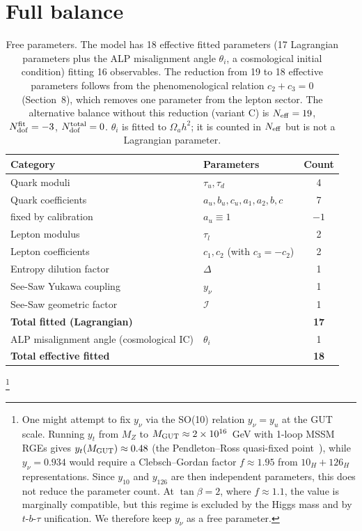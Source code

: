 \documentclass[12pt,a4paper]{article}
\numberwithin{equation}{section}
\begin{document}
\section{Full balance}
\begin{table}[H]
\centering
\caption{Free parameters. The model has 18 effective fitted parameters (17 Lagrangian parameters plus the ALP misalignment angle \(\theta_i\), a cosmological initial condition) fitting 16 observables. The reduction from 19 to 18 effective parameters follows from the phenomenological relation \(c_2 + c_3 = 0\) (Section~8), which removes one parameter from the lepton sector. The alternative balance without this reduction (variant C) is \(N_{\rm eff} = 19\), \(N_{\rm dof}^{\rm fit} = -3\), \(N_{\rm dof}^{\rm total} = 0\). \(\theta_i\) is fitted to \(\Omega_a h^2\); it is counted in \(N_{\rm eff}\) but is not a Lagrangian parameter.}
\begin{tabular}{llc}
\toprule
Category & Parameters & Count \\
\midrule
Quark moduli & \(\tau_u, \tau_d\) & 4 \\
Quark coefficients & \(a_u, b_u, c_u, a_1, a_2, b, c\) & 7 \\
\quad fixed by calibration & \(a_u \equiv 1\) & \(-1\) \\
Lepton modulus & \(\tau_l\) & 2 \\
Lepton coefficients & \(c_1, c_2\) (with \(c_3 = -c_2\)) & 2 \\
Entropy dilution factor & \(\Delta\) & 1 \\
See-Saw Yukawa coupling & \(y_\nu\) & 1 \\
See-Saw geometric factor & \(\mathcal{I}\) & 1 \\
\midrule
\textbf{Total fitted (Lagrangian)} & & \textbf{17} \\
\midrule
ALP misalignment angle (cosmological IC) & \(\theta_i\) & 1 \\
\midrule
\textbf{Total effective fitted} & & \textbf{18} \\
\bottomrule
\end{tabular}
\end{table}

\vspace{0.3cm}
\noindent\footnote{One might attempt to fix \(y_\nu\) via the SO(10) relation \(y_\nu = y_u\) at the GUT scale. Running \(y_t\) from \(M_Z\) to \(M_{\rm GUT} \approx 2\times 10^{16}\)~GeV with 1-loop MSSM RGEs gives \(y_t(M_{\rm GUT}) \approx 0.48\) (the Pendleton--Ross quasi-fixed point~\cite{PendletonRoss1981}), while \(y_\nu = 0.934\) would require a Clebsch--Gordan factor \(f \approx 1.95\) from \(10_H + 126_H\) representations. Since \(y_{10}\) and \(y_{126}\) are then independent parameters, this does not reduce the parameter count. At \(\tan\beta = 2\), where \(f \approx 1.1\), the value is marginally compatible, but this regime is excluded by the Higgs mass and by \(t\)-\(b\)-\(\tau\) unification. We therefore keep \(y_\nu\) as a free parameter.}
\end{document}
